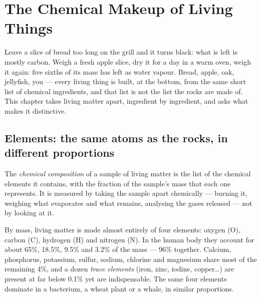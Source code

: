 \chapter{The Chemical Makeup of Living Things}\label{ch:g10:chemistry-of-life}

Leave a slice of bread too long on the grill and it turns black: what is
left is mostly carbon. Weigh a fresh apple slice, dry it for a day in a
warm oven, weigh it again: five sixths of its mass has left as water
vapour. Bread, apple, oak, jellyfish, you --- every living thing is
built, at the bottom, from the same short list of chemical ingredients,
and that list is not the list the rocks are made of. This chapter takes
living matter apart, ingredient by ingredient, and asks what makes it
distinctive.

\section{Elements: the same atoms as the rocks, in different proportions}

\begin{definition}\label{def:g10:chemistry-of-life:composition}
The \emph{chemical composition} of a
sample of living matter is the list of the chemical elements it
contains, with the fraction of the sample's mass that each one
represents. It is measured by taking the sample apart chemically ---
burning it, weighing what evaporates and what remains, analysing the
gases released --- not by looking at it.
\end{definition}

\begin{proposition}\label{prop:g10:chemistry-of-life:four}
By mass, living matter is made almost entirely of four elements:
oxygen (O), carbon (C), hydrogen (H) and nitrogen (N). In the human
body they account for about 65\%, 18.5\%, 9.5\% and 3.2\% of the mass
--- 96\% together. Calcium, phosphorus, potassium, sulfur, sodium,
chlorine and magnesium share most of the remaining 4\%, and a dozen
\emph{trace elements} (iron, zinc, iodine, copper\dots) are present at
far below 0.1\% yet are indispensable. The same four elements dominate
in a bacterium, a wheat plant or a whale, in similar proportions.
\end{proposition}
\admitted


